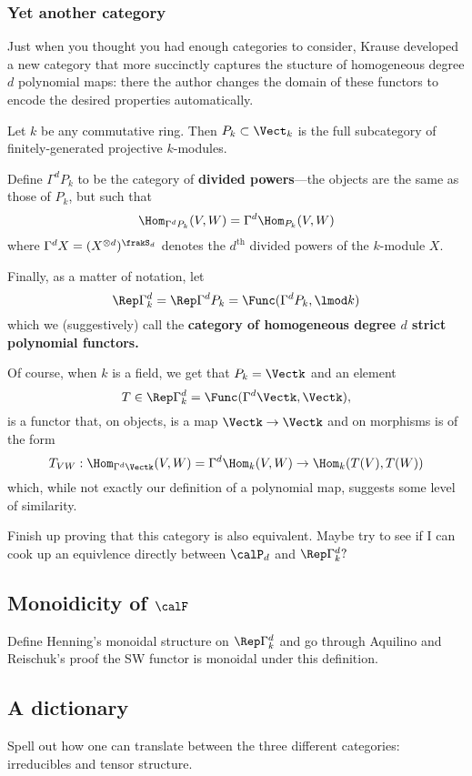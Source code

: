 \documentclass[12pt]{article}
\begin{document}
\subsubsection{Yet another category}
Just when you thought you had enough categories to consider, Krause developed a new category that more succinctly captures
the stucture of homogeneous degree $d$ polynomial maps: there the author changes the domain of these functors 
to encode the desired properties automatically.
\begin{defn}
	Let $k$ be any commutative ring. Then $P_k\subset \Vect_k$ is the full subcategory of finitely-generated projective $k$-modules.

	Define $\Gamma^d P_k$ to be the category of \textbf{divided powers}---the objects are the same as those of $P_k$, but such that 
	\[\Hom_{\Gamma^dP_k}(V,W)=\Gamma^d\Hom_{P_k}(V,W)\]
	where $\Gamma^d X=(X^{\otimes d})^{\frakS_d}$ denotes the \textbf{$d^{\text{th}}$} divided powers of the $k$-module $X$.

	Finally, as a matter of notation, let 
	\[\Rep\Gamma^d_k=\Rep\Gamma^dP_k=\Func(\Gamma^dP_k,\lmod k)\]
	which we (suggestively) call the \textbf{category of homogeneous degree $d$ strict polynomial functors.}
\end{defn}
\begin{rmk}
	Of course, when $k$ is a field, we get that $P_k=\Vectk$ and an element
	\[T\in\Rep\Gamma^d_k=\Func(\Gamma^d\Vectk,\Vectk),\]
	is a functor that, on objects, is a map $\Vectk\to \Vectk$ and on morphisms is of the form 
	\[T_{VW}:\Hom_{\Gamma^d\Vectk}(V,W)=\Gamma^d\Hom_k(V,W)\to \Hom_k(T(V),T(W))\]
	which, while not exactly our definition of a polynomial map, suggests some level of similarity.
\end{rmk}

{\color{red} Finish up proving that this category is also equivalent. Maybe try to see if I can cook up an equivlence directly between $\calP_d$ and $\Rep\Gamma^d_k?$}

\subsection{Monoidicity of \texorpdfstring{$\calF$}{F}}
{\color{red} Define Henning's monoidal structure on $\Rep\Gamma^d_k$ and go through Aquilino and Reischuk's proof 
the SW functor is monoidal under this definition.}

\subsection{A dictionary}
{\color{red} Spell out how one can translate between the three different categories: irreducibles and tensor structure.}
\end{document}
